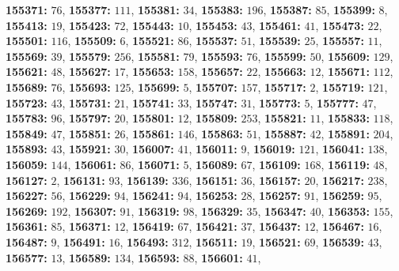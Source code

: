 \textsf{\bfseries 155371:} $76$, \textsf{\bfseries 155377:} $111$, \textsf{\bfseries 155381:} $34$, \textsf{\bfseries 155383:} $196$, \textsf{\bfseries 155387:} $85$, \textsf{\bfseries 155399:} $8$, \textsf{\bfseries 155413:} $19$, \textsf{\bfseries 155423:} $72$, \textsf{\bfseries 155443:} $10$, \textsf{\bfseries 155453:} $43$, \textsf{\bfseries 155461:} $41$, \textsf{\bfseries 155473:} $22$, \textsf{\bfseries 155501:} $116$, \textsf{\bfseries 155509:} $6$, \textsf{\bfseries 155521:} $86$, \textsf{\bfseries 155537:} $51$, \textsf{\bfseries 155539:} $25$, \textsf{\bfseries 155557:} $11$, \textsf{\bfseries 155569:} $39$, \textsf{\bfseries 155579:} $256$, \textsf{\bfseries 155581:} $79$, \textsf{\bfseries 155593:} $76$, \textsf{\bfseries 155599:} $50$, \textsf{\bfseries 155609:} $129$, \textsf{\bfseries 155621:} $48$, \textsf{\bfseries 155627:} $17$, \textsf{\bfseries 155653:} $158$, \textsf{\bfseries 155657:} $22$, \textsf{\bfseries 155663:} $12$, \textsf{\bfseries 155671:} $112$, \textsf{\bfseries 155689:} $76$, \textsf{\bfseries 155693:} $125$, \textsf{\bfseries 155699:} $5$, \textsf{\bfseries 155707:} $157$, \textsf{\bfseries 155717:} $2$, \textsf{\bfseries 155719:} $121$, \textsf{\bfseries 155723:} $43$, \textsf{\bfseries 155731:} $21$, \textsf{\bfseries 155741:} $33$, \textsf{\bfseries 155747:} $31$, \textsf{\bfseries 155773:} $5$, \textsf{\bfseries 155777:} $47$, \textsf{\bfseries 155783:} $96$, \textsf{\bfseries 155797:} $20$, \textsf{\bfseries 155801:} $12$, \textsf{\bfseries 155809:} $253$, \textsf{\bfseries 155821:} $11$, \textsf{\bfseries 155833:} $118$, \textsf{\bfseries 155849:} $47$, \textsf{\bfseries 155851:} $26$, \textsf{\bfseries 155861:} $146$, \textsf{\bfseries 155863:} $51$, \textsf{\bfseries 155887:} $42$, \textsf{\bfseries 155891:} $204$, \textsf{\bfseries 155893:} $43$, \textsf{\bfseries 155921:} $30$, \textsf{\bfseries 156007:} $41$, \textsf{\bfseries 156011:} $9$, \textsf{\bfseries 156019:} $121$, \textsf{\bfseries 156041:} $138$, \textsf{\bfseries 156059:} $144$, \textsf{\bfseries 156061:} $86$, \textsf{\bfseries 156071:} $5$, \textsf{\bfseries 156089:} $67$, \textsf{\bfseries 156109:} $168$, \textsf{\bfseries 156119:} $48$, \textsf{\bfseries 156127:} $2$, \textsf{\bfseries 156131:} $93$, \textsf{\bfseries 156139:} $336$, \textsf{\bfseries 156151:} $36$, \textsf{\bfseries 156157:} $20$, \textsf{\bfseries 156217:} $238$, \textsf{\bfseries 156227:} $56$, \textsf{\bfseries 156229:} $94$, \textsf{\bfseries 156241:} $94$, \textsf{\bfseries 156253:} $28$, \textsf{\bfseries 156257:} $91$, \textsf{\bfseries 156259:} $95$, \textsf{\bfseries 156269:} $192$, \textsf{\bfseries 156307:} $91$, \textsf{\bfseries 156319:} $98$, \textsf{\bfseries 156329:} $35$, \textsf{\bfseries 156347:} $40$, \textsf{\bfseries 156353:} $155$, \textsf{\bfseries 156361:} $85$, \textsf{\bfseries 156371:} $12$, \textsf{\bfseries 156419:} $67$, \textsf{\bfseries 156421:} $37$, \textsf{\bfseries 156437:} $12$, \textsf{\bfseries 156467:} $16$, \textsf{\bfseries 156487:} $9$, \textsf{\bfseries 156491:} $16$, \textsf{\bfseries 156493:} $312$, \textsf{\bfseries 156511:} $19$, \textsf{\bfseries 156521:} $69$, \textsf{\bfseries 156539:} $43$, \textsf{\bfseries 156577:} $13$, \textsf{\bfseries 156589:} $134$, \textsf{\bfseries 156593:} $88$, \textsf{\bfseries 156601:} $41$, 

